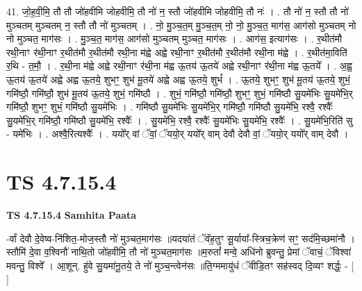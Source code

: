 \documentclass[17pt]{extarticle}
\begin{document}
41. जो॒ह॒वी॒मि॒ तौ तौ जो॑हवीमि जोहवीमि॒ तौ नो॑ न॒ स्तौ जो॑हवीमि जोहवीमि॒ तौ नः॑ । . तौ नो॑ न॒ स्तौ तौ नो॑ मुञ्चतम् मुञ्चतम् न॒ स्तौ तौ नो॑ मुञ्चतम् । . नो॒ मु॒ञ्च॒त॒म् मु॒ञ्च॒त॒म् नो॒ नो॒ मु॒ञ्च॒त॒ माग॑स॒ आग॑सो मुञ्चतम् नो नो मुञ्चत॒ माग॑सः । . मु॒ञ्च॒त॒ माग॑स॒ आग॑सो मुञ्चतम् मुञ्चत॒ माग॑सः । . आग॑स॒ इत्याग॑सः । . र॒थीत॑मौ रथी॒नाꣳ र॑थी॒नाꣳ र॒थीत॑मौ र॒थीत॑मौ रथी॒ना म॑ह्वे अह्वे रथी॒नाꣳ र॒थीत॑मौ र॒थीत॑मौ रथी॒ना म॑ह्वे । . र॒थीत॑मा॒विति॑ र॒थि - त॒मौ॒ । . र॒थी॒ना म॑ह्वे अह्वे रथी॒नाꣳ र॑थी॒ना म॑ह्व ऊ॒तय॑ ऊ॒तये॑ अह्वे रथी॒नाꣳ र॑थी॒ना म॑ह्व ऊ॒तये᳚ । . अ॒ह्व॒ ऊ॒तय॑ ऊ॒तये॑ अह्वे अह्व ऊ॒तये॒ शुभꣳ॒॒ शुभ॑ मू॒तये॑ अह्वे अह्व ऊ॒तये॒ शुभं᳚ । . ऊ॒तये॒ शुभꣳ॒॒ शुभ॑ मू॒तय॑ ऊ॒तये॒ शुभं॒ गमि॑ष्ठौ॒ गमि॑ष्ठौ॒ शुभ॑ मू॒तय॑ ऊ॒तये॒ शुभं॒ गमि॑ष्ठौ । . शुभं॒ गमि॑ष्ठौ॒ गमि॑ष्ठौ॒ शुभꣳ॒॒ शुभं॒ गमि॑ष्ठौ सु॒यमे॑भिः सु॒यमे॑भि॒र् गमि॑ष्ठौ॒ शुभꣳ॒॒ शुभं॒ गमि॑ष्ठौ सु॒यमे॑भिः । . गमि॑ष्ठौ सु॒यमे॑भिः सु॒यमे॑भि॒र् गमि॑ष्ठौ॒ गमि॑ष्ठौ सु॒यमे॑भि॒ रश्वै॒ रश्वैः᳚ सु॒यमे॑भि॒र् गमि॑ष्ठौ॒ गमि॑ष्ठौ सु॒यमे॑भि॒ रश्वैः᳚ । . सु॒यमे॑भि॒ रश्वै॒ रश्वैः᳚ सु॒यमे॑भिः सु॒यमे॑भि॒ रश्वैः᳚ । . सु॒यमे॑भि॒रिति॑ सु - यमे॑भिः । . अश्वै॒रित्यश्वैः᳚ । . ययो᳚र् वां ॅवां॒ ॅययो॒र् ययो᳚र् वाम् देवौ देवौ वां॒ ॅययो॒र् ययो᳚र् वाम् देवौ । \newline
\pagebreak
{}

\section{ TS 4.7.15.4 }

\textbf{TS 4.7.15.4 } \newline
\textbf{Samhita Paata} \newline

-र्वां देवौ दे॒वेष्व-नि॑शित॒-मोज॒स्तौ नो॑ मुञ्चत॒माग॑सः ॥यदया॑तं ॅवॅह॒तुꣳ सू॒र्याया᳚-स्त्रिच॒क्रेण॑ सꣳ॒॒ सद॑मि॒च्छमा॑नौ ।स्तौमि॑ दे॒वा व॒श्विनौ॑ नाथि॒तो जो॑हवीमि॒ तौ नो॑ मुञ्चत॒माग॑सः ॥म॒रुतां᳚ मन्वे॒ अधि॑नो ब्रुवन्तु॒ प्रेमां ॅवाचं॒ ॅविश्वा॑ मवन्तु॒ विश्वे᳚ । आ॒शून्. हु॑वे सु॒यमा॑नू॒तये॒ ते नो॑ मुञ्च॒न्त्वेन॑सः ॥ति॒ग्ममायु॑धं ॅवीडि॒तꣳ सह॑स्वद् दि॒व्यꣳ शर्द्धः॒ - [  ] \newline
\end{document}

